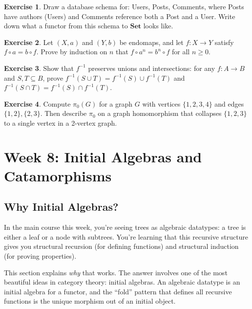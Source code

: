 \documentclass[11pt]{article}
\newcommand{\cat}[1]{\mathbf{#1}}
\newcommand{\Set}{\cat{Set}}
\theoremstyle{definition}
\newtheorem{exercise}{Exercise}[section]
\theoremstyle{plain}
\theoremstyle{remark}
\begin{document}
\begin{exercise}
Draw a database schema for: Users, Posts, Comments, where Posts have authors (Users) and Comments reference both a Post and a User. Write down what a functor from this schema to $\Set$ looks like.
\end{exercise}

\begin{exercise}
Let $(X, a)$ and $(Y, b)$ be endomaps, and let $f: X \to Y$ satisfy $f \circ a = b \circ f$. Prove by induction on $n$ that $f \circ a^n = b^n \circ f$ for all $n \geq 0$.
\end{exercise}

\begin{exercise}
Show that $f^{-1}$ preserves unions and intersections: for any $f: A \to B$ and $S, T \subseteq B$, prove $f^{-1}(S \cup T) = f^{-1}(S) \cup f^{-1}(T)$ and $f^{-1}(S \cap T) = f^{-1}(S) \cap f^{-1}(T)$.
\end{exercise}

\begin{exercise}
Compute $\pi_0(G)$ for a graph $G$ with vertices $\{1,2,3,4\}$ and edges $\{1,2\}, \{2,3\}$. Then describe $\pi_0$ on a graph homomorphism that collapses $\{1,2,3\}$ to a single vertex in a 2-vertex graph.
\end{exercise}

\section{Week 8: Initial Algebras and Catamorphisms}

\subsection*{Why Initial Algebras?}

In the main course this week, you're seeing trees as algebraic datatypes: a tree is either a leaf or a node with subtrees. You're learning that this recursive structure gives you structural recursion (for defining functions) and structural induction (for proving properties).

This section explains \emph{why} that works. The answer involves one of the most beautiful ideas in category theory: initial algebras. An algebraic datatype is an initial algebra for a functor, and the ``fold'' pattern that defines all recursive functions is the unique morphism out of an initial object.
\end{document}
